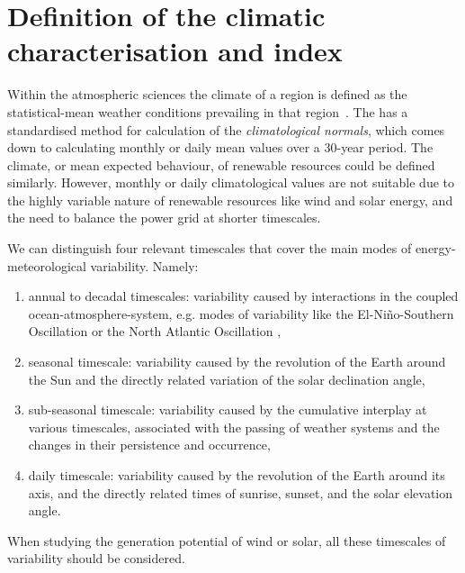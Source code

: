 \documentclass[a4paper,11pt]{extarticle}
\begin{document}

\section{Definition of the climatic characterisation and index}\label{secCP2:clima}
Within the atmospheric sciences the climate of a region is defined as the statistical-mean weather conditions prevailing in that region~\parencite{Arguez2011}. 
The \textcite[WMO;][]{wmo2017normals} has a standardised method for calculation of the \emph{climatological normals}, which comes down to calculating monthly or daily mean values over a 30-year period. 
The climate, or mean expected behaviour, of renewable resources could be defined similarly. 
However, monthly or daily climatological values are not suitable due to the highly variable nature of renewable resources like wind and solar energy, and the need to balance the power grid at shorter timescales.

We can distinguish four relevant timescales that cover the main modes of energy-meteorological variability. 
Namely:
\begin{enumerate}
        \item annual to decadal timescales: variability caused by interactions in the coupled ocean-atmosphere-system, e.g. modes of variability like the El-Ni\~no-Southern Oscillation \parencite[ENSO;][]{ipcc6_wg1_variability} or the North Atlantic Oscillation \parencite[NAO;][]{Wanner2001},
        \item seasonal timescale: variability caused by the revolution of the Earth around the Sun and the directly related variation of the solar declination angle,
        \item sub-seasonal timescale: variability caused by the cumulative interplay at various timescales, associated with the passing of weather systems and the changes in their persistence and occurrence,
        \item daily timescale: variability caused by the revolution of the Earth around its axis, and the directly related times of sunrise, sunset, and the solar elevation angle.
\end{enumerate}
When studying the generation potential of wind or solar, all these timescales of variability should be considered.


\end{document}
